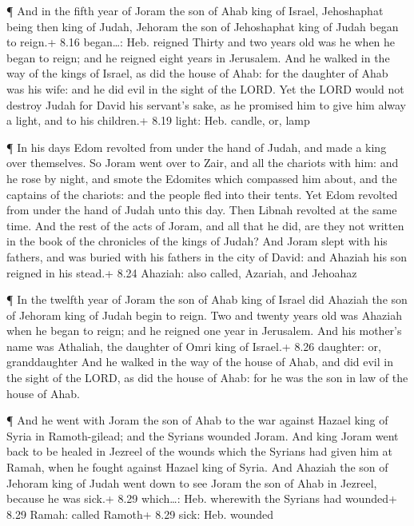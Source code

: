  ¶ And in the fifth year of Joram the son of Ahab king of
Israel, Jehoshaphat being then king of Judah, Jehoram the son of
Jehoshaphat king of Judah began to reign.+ 8.16 began\ldots: Heb.
reigned  Thirty and two years old was he when he began to
reign; and he reigned eight years in Jerusalem.  And he
walked in the way of the kings of Israel, as did the house of Ahab: for
the daughter of Ahab was his wife: and he did evil in the sight of the
LORD.  Yet the LORD would not destroy Judah for David his
servant's sake, as he promised him to give him alway a light, and to his
children.+ 8.19 light: Heb. candle, or, lamp

 ¶ In his days Edom revolted from under the hand of Judah,
and made a king over themselves.  So Joram went over to
Zair, and all the chariots with him: and he rose by night, and smote the
Edomites which compassed him about, and the captains of the chariots:
and the people fled into their tents.  Yet Edom revolted
from under the hand of Judah unto this day. Then Libnah revolted at the
same time.  And the rest of the acts of Joram, and all that
he did, are they not written in the book of the chronicles of the kings
of Judah?  And Joram slept with his fathers, and was buried
with his fathers in the city of David: and Ahaziah his son reigned in
his stead.+ 8.24 Ahaziah: also called, Azariah, and Jehoahaz

 ¶ In the twelfth year of Joram the son of Ahab king of
Israel did Ahaziah the son of Jehoram king of Judah begin to reign.
 Two and twenty years old was Ahaziah when he began to
reign; and he reigned one year in Jerusalem. And his mother's name was
Athaliah, the daughter of Omri king of Israel.+ 8.26 daughter: or,
granddaughter  And he walked in the way of the house of
Ahab, and did evil in the sight of the LORD, as did the house of Ahab:
for he was the son in law of the house of Ahab.

 ¶ And he went with Joram the son of Ahab to the war
against Hazael king of Syria in Ramoth-gilead; and the Syrians wounded
Joram.  And king Joram went back to be healed in Jezreel of
the wounds which the Syrians had given him at Ramah, when he fought
against Hazael king of Syria. And Ahaziah the son of Jehoram king of
Judah went down to see Joram the son of Ahab in Jezreel, because he was
sick.+ 8.29 which\ldots: Heb. wherewith the Syrians had wounded+ 8.29
Ramah: called Ramoth+ 8.29 sick: Heb. wounded

